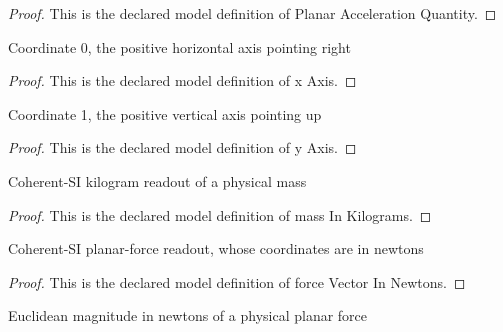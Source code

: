 \begin{proof}
  This is the declared model definition of Planar Acceleration Quantity.
\end{proof}
\begin{definition}[x Axis]
  \label{def:physics:phyx-mini-0755:phyxminiproblems-problemphyxmini0755-xaxis}
  Coordinate 0, the positive horizontal axis pointing right
\end{definition}
\begin{proof}
  This is the declared model definition of x Axis.
\end{proof}
\begin{definition}[y Axis]
  \label{def:physics:phyx-mini-0755:phyxminiproblems-problemphyxmini0755-yaxis}
  Coordinate 1, the positive vertical axis pointing up
\end{definition}
\begin{proof}
  This is the declared model definition of y Axis.
\end{proof}
\begin{definition}
  \label{def:physics:phyx-mini-0755:phyxminiproblems-problemphyxmini0755-massinkilograms}
  Coherent-SI kilogram readout of a physical mass
\end{definition}
\begin{proof}
  This is the declared model definition of mass In Kilograms.
\end{proof}
\begin{definition}
  \label{def:physics:phyx-mini-0755:phyxminiproblems-problemphyxmini0755-forcevectorinnewtons}
  Coherent-SI planar-force readout, whose coordinates are in newtons
\end{definition}
\begin{proof}
  This is the declared model definition of force Vector In Newtons.
\end{proof}
\begin{definition}
  \label{def:physics:phyx-mini-0755:phyxminiproblems-problemphyxmini0755-forcemagnitudeinnewtons}
  Euclidean magnitude in newtons of a physical planar force
\end{definition}
